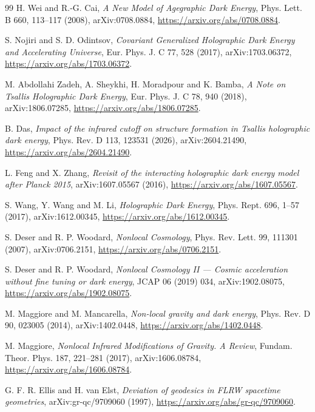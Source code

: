 \documentclass[11pt,a4paper]{article}
\begin{document}
\begin{thebibliography}{99}
H. Wei and R.-G. Cai,
\textit{A New Model of Agegraphic Dark Energy},
Phys. Lett. B 660, 113--117 (2008),
arXiv:0708.0884,
\url{https://arxiv.org/abs/0708.0884}.

S. Nojiri and S. D. Odintsov,
\textit{Covariant Generalized Holographic Dark Energy and Accelerating Universe},
Eur. Phys. J. C 77, 528 (2017),
arXiv:1703.06372,
\url{https://arxiv.org/abs/1703.06372}.


M. Abdollahi Zadeh, A. Sheykhi, H. Moradpour and K. Bamba,
\textit{A Note on Tsallis Holographic Dark Energy},
Eur. Phys. J. C 78, 940 (2018),
arXiv:1806.07285,
\url{https://arxiv.org/abs/1806.07285}.

B. Das,
\textit{Impact of the infrared cutoff on structure formation in Tsallis holographic dark energy},
Phys. Rev. D 113, 123531 (2026),
arXiv:2604.21490,
\url{https://arxiv.org/abs/2604.21490}.

L. Feng and X. Zhang,
\textit{Revisit of the interacting holographic dark energy model after Planck 2015},
arXiv:1607.05567 (2016),
\url{https://arxiv.org/abs/1607.05567}.

S. Wang, Y. Wang and M. Li,
\textit{Holographic Dark Energy},
Phys. Rept. 696, 1--57 (2017),
arXiv:1612.00345,
\url{https://arxiv.org/abs/1612.00345}.

S. Deser and R. P. Woodard,
\textit{Nonlocal Cosmology},
Phys. Rev. Lett. 99, 111301 (2007),
arXiv:0706.2151,
\url{https://arxiv.org/abs/0706.2151}.

S. Deser and R. P. Woodard,
\textit{Nonlocal Cosmology II --- Cosmic acceleration without fine tuning or dark energy},
JCAP 06 (2019) 034,
arXiv:1902.08075,
\url{https://arxiv.org/abs/1902.08075}.

M. Maggiore and M. Mancarella,
\textit{Non-local gravity and dark energy},
Phys. Rev. D 90, 023005 (2014),
arXiv:1402.0448,
\url{https://arxiv.org/abs/1402.0448}.

M. Maggiore,
\textit{Nonlocal Infrared Modifications of Gravity. A Review},
Fundam. Theor. Phys. 187, 221--281 (2017),
arXiv:1606.08784,
\url{https://arxiv.org/abs/1606.08784}.

G. F. R. Ellis and H. van Elst,
\textit{Deviation of geodesics in FLRW spacetime geometries},
arXiv:gr-qc/9709060 (1997),
\url{https://arxiv.org/abs/gr-qc/9709060}.


\end{thebibliography}
\end{document}

